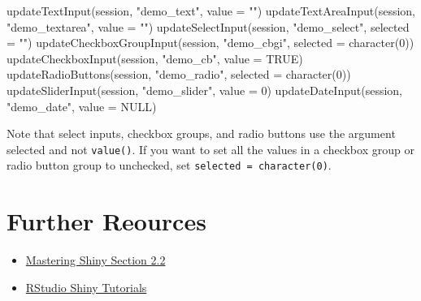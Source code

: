 \documentclass[
  oneside]{book}
\newenvironment{Shaded}{\begin{snugshade}}{\end{snugshade}}
\newcommand{\AttributeTok}[1]{\textcolor[rgb]{0.77,0.63,0.00}{#1}}
\newcommand{\ConstantTok}[1]{\textcolor[rgb]{0.00,0.00,0.00}{#1}}
\newcommand{\DecValTok}[1]{\textcolor[rgb]{0.00,0.00,0.81}{#1}}
\newcommand{\FunctionTok}[1]{\textcolor[rgb]{0.00,0.00,0.00}{#1}}
\newcommand{\NormalTok}[1]{#1}
\newcommand{\StringTok}[1]{\textcolor[rgb]{0.31,0.60,0.02}{#1}}
\providecommand{\tightlist}{%
  \setlength{\itemsep}{0pt}\setlength{\parskip}{0pt}}
\begin{document}
\begin{Shaded}
\begin{Highlighting}[]
\FunctionTok{updateTextInput}\NormalTok{(session, }\StringTok{"demo\_text"}\NormalTok{, }\AttributeTok{value =} \StringTok{""}\NormalTok{)}
\FunctionTok{updateTextAreaInput}\NormalTok{(session, }\StringTok{"demo\_textarea"}\NormalTok{, }\AttributeTok{value =} \StringTok{""}\NormalTok{)}
\FunctionTok{updateSelectInput}\NormalTok{(session, }\StringTok{"demo\_select"}\NormalTok{, }\AttributeTok{selected =} \StringTok{""}\NormalTok{)}
\FunctionTok{updateCheckboxGroupInput}\NormalTok{(session, }\StringTok{"demo\_cbgi"}\NormalTok{, }\AttributeTok{selected =} \FunctionTok{character}\NormalTok{(}\DecValTok{0}\NormalTok{))}
\FunctionTok{updateCheckboxInput}\NormalTok{(session, }\StringTok{"demo\_cb"}\NormalTok{, }\AttributeTok{value =} \ConstantTok{TRUE}\NormalTok{)}
\FunctionTok{updateRadioButtons}\NormalTok{(session, }\StringTok{"demo\_radio"}\NormalTok{, }\AttributeTok{selected =} \FunctionTok{character}\NormalTok{(}\DecValTok{0}\NormalTok{))}
\FunctionTok{updateSliderInput}\NormalTok{(session, }\StringTok{"demo\_slider"}\NormalTok{, }\AttributeTok{value =} \DecValTok{0}\NormalTok{)}
\FunctionTok{updateDateInput}\NormalTok{(session, }\StringTok{"demo\_date"}\NormalTok{, }\AttributeTok{value =} \ConstantTok{NULL}\NormalTok{)}
\end{Highlighting}
\end{Shaded}

\begin{warning}
Note that select inputs, checkbox groups, and radio buttons use the argument \AttributeTok{selected} and not \texttt{value}\texttt{()}. If you want to set all the values in a checkbox group or radio button group to unchecked, set \texttt{selected\ =\ character(0)}.

\end{warning}

\hypertarget{resources-inputs}{%
\section{Further Reources}\label{resources-inputs}}

\begin{itemize}
\tightlist
\item
  \href{https://mastering-shiny.org/basic-ui.html\#inputs}{Mastering Shiny Section 2.2}
\item
  \href{https://vimeo.com/rstudioinc/review/131218530/212d8a5a7a/\#t=10m41s}{RStudio Shiny Tutorials}
\end{itemize}
\end{document}
